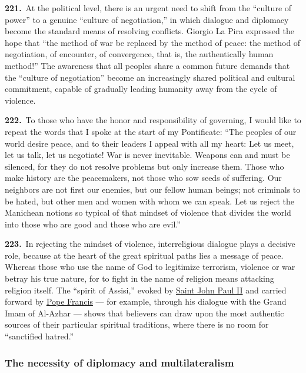 \documentclass{article}
\begin{document}
\textbf{221.}\ At the political level, there is an urgent need to shift from the ``culture of power'' to a genuine ``culture of negotiation,'' in which dialogue and diplomacy become the standard means of resolving conflicts. Giorgio La Pira expressed the hope that ``the method of war be replaced by the method of peace: the method of negotiation, of encounter, of convergence, that is, the authentically human method!''\cite{n197} The awareness that all peoples share a common future demands that the ``culture of negotiation'' become an increasingly shared political and cultural commitment, capable of gradually leading humanity away from the cycle of violence.

\textbf{222.}\ To those who have the honor and responsibility of governing, I would like to repeat the words that I spoke at the start of my Pontificate: ``The peoples of our world desire peace, and to their leaders I appeal with all my heart: Let us meet, let us talk, let us negotiate! War is never inevitable. Weapons can and must be silenced, for they do not resolve problems but only increase them. Those who make history are the peacemakers, not those who sow seeds of suffering. Our neighbors are not first our enemies, but our fellow human beings; not criminals to be hated, but other men and women with whom we can speak. Let us reject the Manichean notions so typical of that mindset of violence that divides the world into those who are good and those who are evil.''\cite{n198}

\textbf{223.}\ In rejecting the mindset of violence, interreligious dialogue plays a decisive role, because at the heart of the great spiritual paths lies a message of peace.\cite{n199} Whereas those who use the name of God to legitimize terrorism, violence or war betray his true nature, for to fight in the name of religion means attacking religion itself.\cite{n200} The ``spirit of Assisi,'' evoked by \href{https://www.vatican.va/content/john-paul-ii/en.html}{Saint John Paul II} and carried forward by \href{https://www.vatican.va/content/francesco/en.html}{Pope Francis} --- for example, through his dialogue with the Grand Imam of Al-Azhar --- shows that believers can draw upon the most authentic sources of their particular spiritual traditions, where there is no room for ``sanctified hatred.''

\subsubsection{The necessity of diplomacy and multilateralism}
\end{document}
